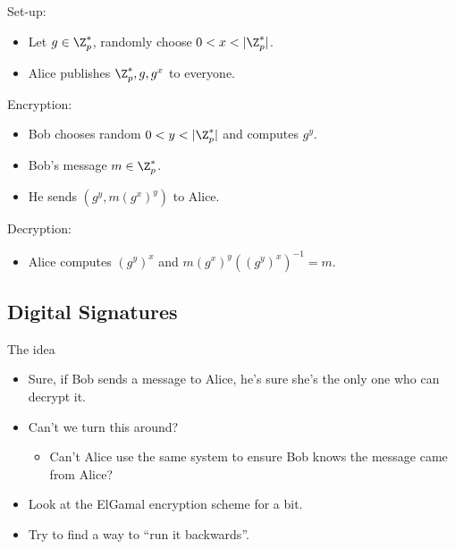 \begin{frame}
  \begin{definition}
    Set-up:
    \begin{itemize}
      \item Let \(g\in \Z_p^*\), randomly choose \(0 < x < |\Z_p^*|\).
      \item Alice publishes \(\Z_p^*, g, g^x\) to everyone.
    \end{itemize}
    Encryption:
    \begin{itemize}
      \item Bob chooses random \(0 < y < |\Z_p^*|\) and computes \(g^y\).
      \item Bob's message \(m\in \Z_p^*\).
      \item He sends \((g^y, m(g^{x})^y)\) to Alice.
    \end{itemize}
    Decryption:
    \begin{itemize}
      \item Alice computes \((g^y)^x\) and \(m(g^x)^y((g^{y})^x)^{-1} = m\).
    \end{itemize}
  \end{definition}
\end{frame}

\subsection{Digital Signatures}

\begin{frame}
  \begin{block}{The idea}
    \begin{itemize}
      \item Sure, if Bob sends a message to Alice, he's sure she's the only one
        who can decrypt it.

        \pause{}

      \item Can't we turn this around?
        \begin{itemize}
          \item Can't Alice use the same system to ensure Bob knows the message
            came from Alice?
        \end{itemize}
    \end{itemize}
  \end{block}

  \pause{}

  \begin{exercise}
    \begin{itemize}
      \item Look at the ElGamal encryption scheme for a bit.
      \item Try to find a way to \enquote{run it backwards}.
    \end{itemize}
  \end{exercise}
\end{frame}

